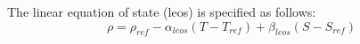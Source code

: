 The linear equation of state (leos) is specified as follows:
\begin{equation}
\rho = \rho_{ref} - \alpha_{leos}(T-T_{ref})+\beta_{leos}(S-S_{ref})
\end{equation}